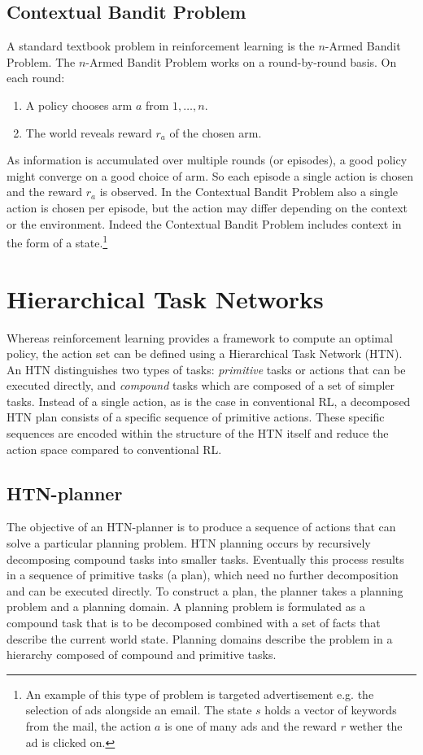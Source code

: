 \subsection{Contextual Bandit Problem}
A standard textbook problem in reinforcement learning is the $n$-Armed Bandit
Problem.  The $n$-Armed Bandit Problem works on a round-by-round basis.  On
each round:
\begin{enumerate}
\item{A policy chooses arm $a$ from $1,\ldots,n$.}
\item{The world reveals reward $r_a$ of the chosen arm.}
\end{enumerate}
As information is accumulated over multiple rounds (or episodes), a good policy
might converge on a good choice of arm. So each episode a single action is
chosen and the reward $r_a$ is observed. In the Contextual Bandit Problem also
a single action is chosen per episode, but the action may differ depending on
the context or the environment. Indeed the Contextual Bandit Problem includes
context in the form of a state.\footnote{An example of this type of problem is
targeted advertisement e.g. the selection of ads alongside an email. The state
$s$ holds a vector of keywords from the mail, the action $a$ is one of many ads
and the reward $r$ wether the ad is clicked on.}

\section{Hierarchical Task Networks}
Whereas reinforcement learning provides a framework to compute an optimal
policy, the action set can be defined using a Hierarchical Task Network (HTN).
An HTN distinguishes two types of tasks: \emph{primitive} tasks or actions that
can be executed directly, and \emph{compound} tasks which are composed of a set of
simpler tasks. Instead of a single action, as is the case in conventional RL, a
decomposed HTN plan consists of a specific sequence of primitive actions. These
specific sequences are encoded within the structure of the HTN itself and
reduce the action space compared to conventional RL.

\subsection{HTN-planner}
The objective of an HTN-planner \cite{shop, shop2} is to produce a sequence of
actions that can solve a particular planning problem. HTN planning occurs by
recursively decomposing compound tasks into smaller tasks. Eventually this
process results in a sequence of primitive tasks (a plan), which need no
further decomposition and can be executed directly. To construct a plan, the
planner takes a planning problem and a planning domain. A planning problem is
formulated as a compound task that is to be decomposed combined with a set of
facts that describe the current world state. Planning domains describe the
problem in a hierarchy composed of compound and primitive tasks.

